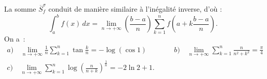 {{La somme $\overline{S}_{f}^{\sigma}$ conduit de manière similaire à l'inégalité inverse,
d'o\`u :
\begin{equation*}
\int_{a}^{b} f(x)\,dx =
\lim_{n\rightarrow+\infty}\left(\frac{b-a}{n}\right)
\sum_{k=1}^{n}f\left(a+k\frac{b-a}{n}\right).
\end{equation*}
On a~:
\begin{eqnarray*}
a)\quad\lim_{n\rightarrow+\infty}
\frac{1}{n}\sum_{k=1}^{n}\tan\frac{k}{n} = -\log(\cos 1)
\quad\quad\quad &
b)\quad\lim_{n\rightarrow+\infty}\sum_{k=1}^{n}\frac{n}{n^2+k^2} =
\frac{\pi}{4} \quad\quad\quad\\
c)\quad\lim_{n\rightarrow+\infty}\sum_{k=1}^{n}\log\left(\frac{n}{n+k}\right)^{\frac{1}{n}}
= -2\ln 2 + 1. &
\end{eqnarray*}
}
}
